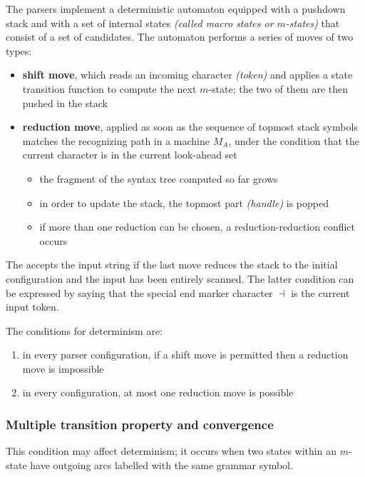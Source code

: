 \documentclass[english]{article}
\begin{document}
The \ELRo parsers implement a deterministic automaton equipped with a pushdown stack and with a set of internal states \textit{(called macro states or \(m\)-states)} that consist of a set of candidates.
The automaton performs a series of moves of two types:

\begin{itemize}
  \item \textbf{shift move}, which reads an incoming character \textit{(token)} and applies a state transition function to compute the next \(m\)-state; the two of them are then pushed in the stack
  \item \textbf{reduction move}, applied as soon as the sequence of topmost stack symbols matches the recognizing path in a machine \(M_A\), under the condition that the current character is in the current look-ahead set
        \begin{itemize}[label=\(\rightarrow\)]
          \item the fragment of the syntax tree computed so far grows
          \item in order to update the stack, the topmost part \textit{(handle)} is popped
          \item if more than one reduction can be chosen, a reduction-reduction conflict occurs
        \end{itemize}
\end{itemize}

The \PDA accepts the input string if the last move reduces the stack to the initial configuration and the input has been entirely scanned.
The latter condition can be expressed by saying that the special end marker character \(\dashv\) is the current input token.

\bigskip
The conditions for determinism are:

\begin{enumerate}
  \item in every parser configuration, if a shift move is permitted then a reduction move is impossible
  \item in every configuration, at most one reduction move is possible
\end{enumerate}

\subsubsection{Multiple transition property and convergence}

This condition may affect determinism;
it occurs when two states within an \(m\)-state have outgoing arcs labelled with the same grammar symbol.
\end{document}
